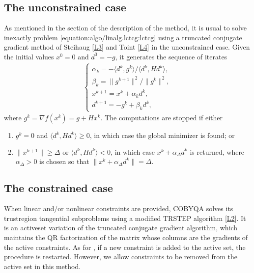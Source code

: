 \documentclass[letterpaper,10pt,english]{sphinxmanual}
\newcommand{\norm}[2][]{#1\lVert#2#1\rVert}
\newcommand{\inner}[2][]{#1\langle#2#1\rangle}
\begin{document}
\subsection{The unconstrained case}
\label{\detokenize{algo/linalg.lctcg:the-unconstrained-case}}
\sphinxAtStartPar
As mentioned in the section {\hyperref[\detokenize{algo/linalg.bvtcg:tcg-base}]{}} of the description of the 
method, it is usual to solve inexactly problem \eqref{equation:algo/linalg.lctcg:lctcg} using a truncated
conjugate gradient method of Steihaug {[}\hyperlink{cite.algo/linalg.lctcg:cite-1-lctcg-steihaug-1983}{L3}{]} and Toint
{[}\hyperlink{cite.algo/linalg.lctcg:cite-1-lctcg-toint-1981}{L4}{]} in the unconstrained case. Given the initial values
\(x^0 = 0\) and \(d^0 = -g\), it generates the sequence of iterates
\begin{equation*}
\begin{split}\left\{
\begin{array}{l}
    \alpha_k = -\inner{d^k, g^k} / \inner{d^k, Hd^k},\\
    \beta_k = \norm{g^{k + 1}}^2 / \norm{g^k}^2,\\
    x^{k + 1} = x^k + \alpha_k d^k,\\
    d^{k + 1} = -g^k + \beta_k d^k,
\end{array}
\right.\end{split}
\end{equation*}
\sphinxAtStartPar
where \(g^k = \nabla f(x^k) = g + Hx^k\). The computations are stopped if
either
\begin{enumerate}
%
\item {} 
\sphinxAtStartPar
\(g^k = 0\) and \(\inner{d^k, Hd^k} \ge 0\), in which case the
global minimizer is found; or

\item {} 
\sphinxAtStartPar
\(\norm{x^{k + 1}} \ge \Delta\) or \(\inner{d^k, Hd^k} < 0\), in
which case \(x^k + \alpha_{\Delta} d^k\) is returned, where
\(\alpha_{\Delta} > 0\) is chosen so that
\(\norm{x^k + \alpha_{\Delta} d^k} = \Delta\).

\end{enumerate}


\subsection{The constrained case}
\label{\detokenize{algo/linalg.lctcg:the-constrained-case}}
\sphinxAtStartPar
When linear and/or nonlinear constraints are provided, COBYQA solves its
trust\sphinxhyphen{}region tangential subproblems using a modified TRSTEP algorithm
{[}\hyperlink{cite.algo/linalg.lctcg:cite-1-lctcg-powell-2015}{L2}{]}. It is an active\sphinxhyphen{}set variation of the truncated
conjugate gradient algorithm, which maintains the QR factorization of the
matrix whose columns are the gradients of the active constraints. As for
, if a new constraint is added to the active set, the procedure is
restarted. However, we allow constraints to be removed from the active set in
this method.
\end{document}
